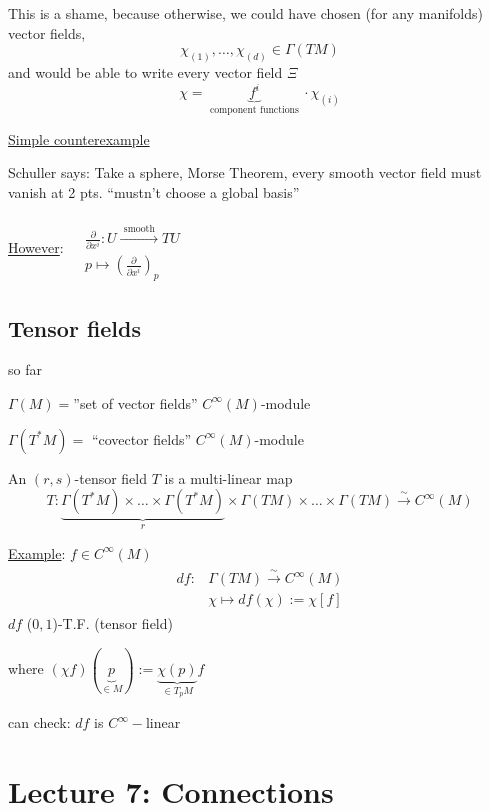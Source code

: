 	This is a shame, because otherwise, we could have chosen (for any manifolds) vector fields, 
	\[
	\chi_{(1)}, \dots , \chi_{(d)} \in \Gamma(TM)
	\]
	and would be able to write every vector field $\Xi$
	\[
	\chi = \underbrace{ f^i }_{\text{ component functions } } \cdot \chi_{(i)}
	\]
	
	\underline{Simple counterexample}
	
	Schuller says: Take a sphere, Morse Theorem, every smooth vector field must vanish at 2 pts. ``mustn't choose a global basis''
	
	
	\underline{However}: $\begin{aligned} & \quad \\
	& \frac{ \partial }{ \partial x^i} : U \xrightarrow{ \text{ smooth }} TU \\
	& p \mapsto \left( \frac{ \partial }{ \partial x^i } \right)_p
	\end{aligned}$
	
	\subsection{Tensor fields}
	
	so far
	
	$\Gamma(M) = $''set of vector fields''  $C^{\infty}(M)$-module
	
	$\Gamma(T^*M) = $ ``covector fields'' $C^{\infty}(M)$-module
	
	\begin{definition}
		An $(r,s)$-tensor field $T$ is a multi-linear map
		\[
		T:\underbrace{ \Gamma(T^*M) \times \dots \times \Gamma(T^*M) }_{r} \times \Gamma(TM) \times \dots \times \Gamma(TM) \xrightarrow{ \sim } C^{\infty}(M)
		\]
	\end{definition}
	
	\underline{Example}: $f\in C^{\infty}(M)$ 
	\[
	\begin{gathered}
	\begin{aligned} 
	df : & \Gamma(TM) \xrightarrow{ \sim } C^{\infty}(M) \\ 
	& \chi \mapsto df(\chi) := \chi [f]
	\end{aligned}
	\end{gathered}
	\]
	$df$ ($0,1$)-T.F. (tensor field)
	
	where $(\chi f)(\underbrace{p}_{ \in M}) := \underbrace{ \chi(p) }_{ \in T_pM}f$
	
	can check: $df$ is $C^{\infty}-$linear
	
	
	\section*{Lecture 7: Connections}

